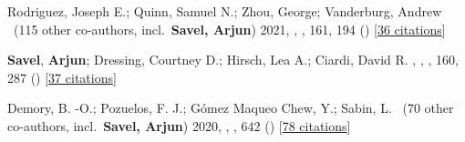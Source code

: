 \item[{\color{numcolor}\scriptsize3}] Rodriguez, Joseph E.; Quinn, Samuel N.; Zhou, George; Vanderburg, Andrew \etal\ ({115} other co-authors, incl.\ \textbf{Savel, Arjun}) 2021, , \aj, {161}, 194 () [\href{https://ui.adsabs.harvard.edu/abs/2021AJ....161..194R}{36 citations}]

\item[{\color{numcolor}\scriptsize2}] \textbf{Savel}, \textbf{Arjun}; Dressing, Courtney D.; Hirsch, Lea A.; Ciardi, David R. , , \aj, {160}, 287 () [\href{https://ui.adsabs.harvard.edu/abs/2020AJ....160..287S}{37 citations}]

\item[{\color{numcolor}\scriptsize1}] Demory, B. -O.; Pozuelos, F. J.; G{\'o}mez Maqueo Chew, Y.; Sabin, L. \etal\ ({70} other co-authors, incl.\ \textbf{Savel, Arjun}) 2020, , \aanda, {642} () [\href{https://ui.adsabs.harvard.edu/abs/2020A&A...642A..49D}{78 citations}]